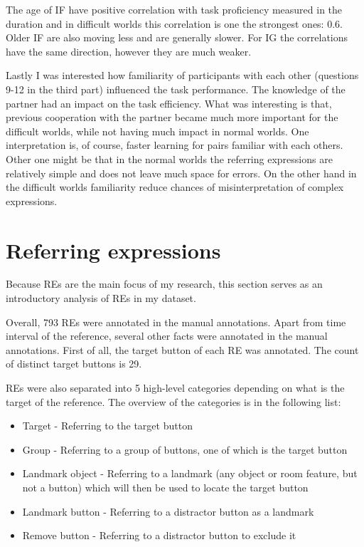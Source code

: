 The age of IF have positive correlation with task proficiency measured in the duration and in difficult worlds this correlation is one the strongest ones: 0.6. Older IF are also moving less and are generally slower. For IG the correlations have the same direction, however they are much weaker.

Lastly I was interested how familiarity of participants with each other (questions 9-12 in the third part) influenced the task performance. The knowledge of the partner had an impact on the task efficiency. What was interesting is that, previous cooperation with the partner became much more important for the difficult worlds, while not having much impact in normal worlds. One interpretation is, of course, faster learning for pairs familiar with each others. Other one might be that in the normal worlds the referring expressions are relatively simple and does not leave much space for errors. On the other hand in the difficult worlds familiarity reduce chances of misinterpretation of complex expressions.

\section{Referring expressions}
Because REs are the main focus of my research, this section serves as an introductory analysis of REs in my dataset.

Overall, 793 REs were annotated in the manual annotations. Apart from time interval of the reference, several other facts were annotated in the manual annotations. First of all, the target button of each RE was annotated. The count of distinct target buttons is 29.  

REs were also separated into 5 high-level categories depending on what is the target of the reference. The  overview of the categories is in the following list:

\begin{itemize}
\item
Target - Referring to the target button
\item
Group - Referring to a group of buttons, one of which is the target button
\item
Landmark object - Referring to a landmark (any object or room feature, but not a button) which will then be used to locate the target button
\item
Landmark button - Referring to a distractor button as a landmark
\item
Remove button -  Referring to a distractor button to exclude it
\end{itemize}

